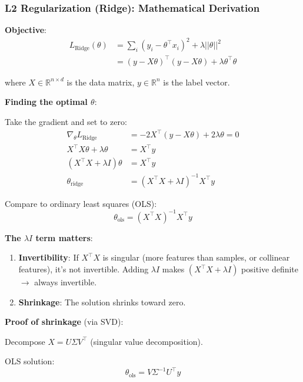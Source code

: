 \documentclass[11pt,oneside]{book}
\begin{document}
\subsubsection{L2 Regularization (Ridge): Mathematical Derivation}

\textbf{Objective}:
\begin{align}
L_{\text{Ridge}}(\theta) &= \sum_{i} (y_i - \theta^\top x_i)^2 + \lambda||\theta||^2 \\
&= (y - X\theta)^\top(y - X\theta) + \lambda\theta^\top\theta
\end{align}

where $X \in \mathbb{R}^{n \times d}$ is the data matrix, $y \in \mathbb{R}^n$ is the label vector.

\textbf{Finding the optimal $\theta$}:

Take the gradient and set to zero:
\begin{align}
\nabla_\theta L_{\text{Ridge}} &= -2X^\top(y - X\theta) + 2\lambda\theta = 0 \\
X^\top X\theta + \lambda\theta &= X^\top y \\
(X^\top X + \lambda I)\theta &= X^\top y \\
\theta_{\text{ridge}} &= (X^\top X + \lambda I)^{-1} X^\top y
\end{align}

Compare to ordinary least squares (OLS):
\begin{equation}
\theta_{\text{ols}} = (X^\top X)^{-1} X^\top y
\end{equation}

\textbf{The $\lambda I$ term matters}:

\begin{enumerate}
    \item \textbf{Invertibility}: If $X^\top X$ is singular (more features than samples, or collinear features), it's not invertible. Adding $\lambda I$ makes $(X^\top X + \lambda I)$ positive definite $\rightarrow$ always invertible.

    \item \textbf{Shrinkage}: The solution shrinks toward zero.
\end{enumerate}

\textbf{Proof of shrinkage} (via SVD):

Decompose $X = U\Sigma V^\top$ (singular value decomposition).

OLS solution:
\begin{equation}
\theta_{\text{ols}} = V\Sigma^{-1}U^\top y
\end{equation}
\end{document}

